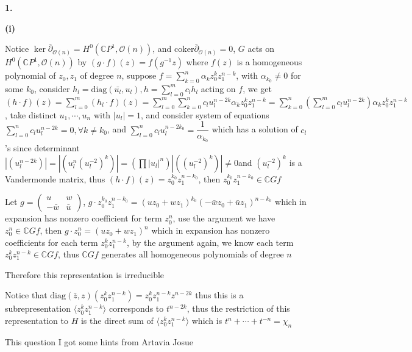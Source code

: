 \documentclass[../main.tex]{subfiles}
\begin{document}
\textbf{1.} \par
\textbf{(i)} \par
Notice $\ker\bar\partial_{\mathcal O(n)}=H^0(\mathbb CP^1,\mathcal O(n))$, and $\mathrm{coker}\bar\partial_{\mathcal O(n)}=0$, $G$ acts on $H^0(\mathbb CP^1,\mathcal O(n))$ by $(g\cdot f)(z)=f(g^{-1}z)$ where $f(z)$ is a homogeneous polynomial of $z_0,z_1$ of degree $n$, suppose $\displaystyle f=\sum_{k=0}^n\alpha_kz_0^kz_1^{n-k}$, with $\alpha_{k_0}\neq0$ for some $k_0$, consider $\displaystyle h_l= \mathrm{diag}(\bar {u_l},u_l), h=\sum_{l=0}^m c_lh_l$ acting on $f$, we get $(h\cdot f)(z)=\sum_{l=0}^m(h_l\cdot f)(z)=\displaystyle\sum_{l=0}^m\sum_{k=0}^n c_lu_l^{n-2k}\alpha_kz_0^kz_1^{n-k}=\sum_{k=0}^n\left(\sum_{l=0}^m c_lu_l^{n-2k}\right)\alpha_kz_0^kz_1^{n-k}$, take distinct $u_1,\cdots,u_n$ with $|u_l|=1$, and consider system of equations $\displaystyle\sum_{l=0}^n c_lu_l^{n-2k}=0,\forall k\neq k_0$, and $\displaystyle\sum_{l=0}^n c_lu_l^{n-2k_0}=\dfrac{1}{\alpha_{k_0}}$ which has a solution of $c_l$'s since determinant $\left|(u_l^{n-2k})\right|=\left|\left(u_l^{n}(u_l^{-2})^k\right)\right|=\left(\prod |u_l|^{n}\right)\left|\left((u_l^{-2})^k\right)\right|\neq0$and $(u_l^{-2})^k$ is a Vandermonde matrix, thus $(h\cdot f)(z)=z_0^{k_0}z_1^{n-k_0}$, then $z_0^{k_0}z_1^{n-k_0}\in \mathbb CGf$ \par
Let $g=\begin{pmatrix}
u&w \\
-\bar w&\bar u
\end{pmatrix}$, $g\cdot z_0^{k_0}z_1^{n-k_0}=\left(uz_0+wz_1\right)^{k_0}\left(-\bar wz_0+\bar uz_1\right)^{n-k_0}$ which in expansion has nonzero coefficient for term $z_0^n$, use the argument we have $z_0^n\in\mathbb CGf$, then $g\cdot z_0^n=\left(uz_0+wz_1\right)^n$ which in expansion has nonzero coefficients for each term $z_0^kz_1^{n-k}$, by the argument again, we know each term $z_0^kz_1^{n-k}\in\mathbb CGf$, thus $\mathbb CGf$ generates all homogeneous polynomials of degree $n$ \par
Therefore this representation is irreducible \par
Notice that $\mathrm{diag}(\bar z,z)(z_0^kz_1^{n-k})=z_0^kz_1^{n-k}z^{n-2k}$ thus this is a subrepresentation $\langle z_0^kz_1^{n-k}\rangle$ corresponds to $t^{n-2k}$, thus the restriction of this representation to $H$ is the direct sum of $\langle z_0^kz_1^{n-k}\rangle$ which is $t^n+\cdots+t^{-n}=\chi_n$ \par
This question I got some hints from Artavia Josue \par
\end{document}
